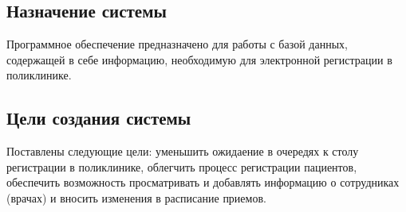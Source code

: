 \subsection{Назначение системы}

Программное обеспечение предназначено для работы с базой данных, содержащей в себе информацию, необходимую для электронной регистрации в поликлинике.

\subsection{Цели создания системы}

Поставлены следующие цели: уменьшить ожидаение в очередях к столу регистрации в поликлинике, облегчить процесс регистрации пациентов, обеспечить возможность просматривать и добавлять информацию о сотрудниках (врачах) и вносить изменения в расписание приемов.
